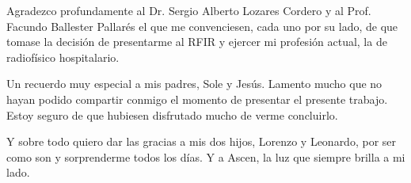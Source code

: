 \begin{flushright}
Agradezco profundamente al Dr. Sergio Alberto Lozares Cordero y al Prof. Facundo Ballester Pallarés el que me convenciesen, cada uno por su lado, de que tomase la decisión de presentarme al RFIR y ejercer mi profesión actual, la de radiofísico hospitalario.

Un recuerdo muy especial a mis padres, Sole y Jesús. Lamento mucho que no hayan podido compartir conmigo el momento de presentar el presente trabajo. Estoy seguro de que hubiesen disfrutado mucho de verme concluirlo.

Y sobre todo quiero dar las gracias a mis dos hijos, Lorenzo y Leonardo, por ser como son y sorprenderme todos los días. Y a Ascen, la luz que siempre brilla a mi lado.

\end{flushright}

\justify